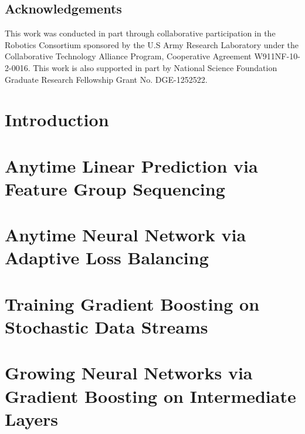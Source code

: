 \documentclass[]{report}
\newcommand{\GOMPDIR}{1_gomp}
\newcommand{\SGBDIR}{2_sgb}
\newcommand{\ANNDIR}{3_ann}
\newcommand{\NASDIR}{4_nas}
\begin{document}
\section*{Acknowledgements}
This work was conducted in part through collaborative participation in the Robotics Consortium sponsored by the U.S Army Research  Laboratory  under  the  Collaborative  Technology  Alliance Program, Cooperative Agreement W911NF-10-2-0016. This work is also supported in part by National Science Foundation Graduate Research Fellowship Grant No. DGE-1252522.


\tableofcontents

\linenumbers
\chapter{Introduction}
\label{chapter:thesis_introduction}


\chapter{Anytime Linear Prediction via Feature Group Sequencing}
\label{chapter:anytime_linear}


\chapter{Anytime Neural Network via Adaptive Loss Balancing}
\label{chapter:ann}


\chapter{Training Gradient Boosting on Stochastic Data Streams}
\label{chapter:sgb}


\chapter{Growing Neural Networks via Gradient Boosting on Intermediate Layers}
\label{chapter:nas}




\end{document}
